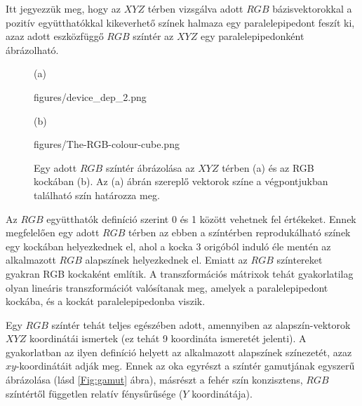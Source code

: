 Itt jegyezzük meg, hogy az $XYZ$ térben vizsgálva adott $RGB$ bázisvektorokkal a pozitív együtthatókkal kikeverhető színek halmaza egy paralelepipedont feszít ki, azaz adott eszközfüggő $RGB$ színtér az $XYZ$ egy paralelepipedonként ábrázolható.
\begin{figure}[]
	\centering
	\small
	(a)
	\begin{overpic}[width = 0.45\columnwidth ]{figures/device_dep_2.png}
	\end{overpic}
	(b)
	\begin{overpic}[width = 0.45\columnwidth ]{figures/The-RGB-colour-cube.png}
	\end{overpic}
	\caption{Egy adott $RGB$ színtér ábrázolása az $XYZ$ térben (a) és az RGB kockában (b). Az (a) ábrán szereplő vektorok színe a végpontjukban található szín határozza meg.}
	\label{Fig:device_dep}
\end{figure}
Az $RGB$ együtthatók definíció szerint 0 és 1 között vehetnek fel értékeket.
Ennek megfelelően egy adott $RGB$ térben az ebben a színtérben reprodukálható színek egy kockában helyezkednek el, ahol a kocka 3 origóból induló éle mentén az alkalmazott $RGB$ alapszínek helyezkednek el.
Emiatt az $RGB$ színtereket gyakran RGB kockaként említik.
A transzformációs mátrixok tehát gyakorlatilag olyan lineáris transzformációt valósítanak meg, amelyek a paralelepipedont kockába, és a kockát paralelepipedonba viszik.

\vspace{3mm}
Egy $RGB$ színtér tehát teljes egészében adott, amennyiben az alapszín-vektorok $XYZ$ koordinátái ismertek (ez tehát 9 koordináta ismeretét jelenti).
A gyakorlatban az ilyen definíció helyett az alkalmazott alapszínek színezetét, azaz $xy$-koordinátáit adják meg.
Ennek az oka egyrészt a színtér gamutjának egyszerű ábrázolása (lásd \ref{Fig:gamut} ábra), másrészt a fehér szín konzisztens, $RGB$ színtértől független relatív fénysűrűsége ($Y$ koordinátája).

